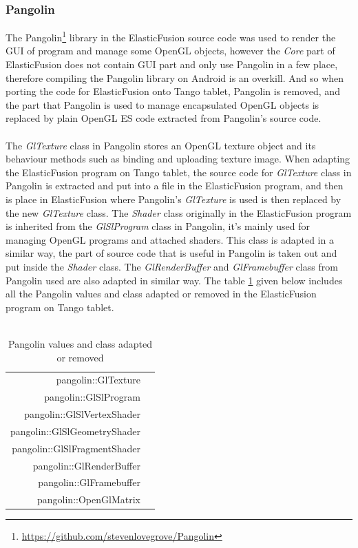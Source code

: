 \documentclass[12pt,twoside]{article}
\begin{document}
\subsubsection{Pangolin}
The Pangolin\footnote{\url{https://github.com/stevenlovegrove/Pangolin}} library in the ElasticFusion source code was used to render the GUI of program and manage some OpenGL objects, however the \textit{Core} part of ElasticFusion does not contain GUI part and only use Pangolin in a few place, therefore compiling the Pangolin library on Android is an overkill. And so when porting the code for ElasticFusion onto Tango tablet, Pangolin is removed, and the part that Pangolin is used to manage encapsulated OpenGL objects is replaced by plain OpenGL ES code extracted from Pangolin's source code.\\
\\
The \textit{GlTexture} class in Pangolin stores an OpenGL texture object and its behaviour methods such as binding and uploading texture image. When adapting the ElasticFusion program on Tango tablet, the source code for \textit{GlTexture} class in Pangolin is extracted and put into a file in the ElasticFusion program, and then is place in ElasticFusion where Pangolin's \textit{GlTexture} is used is then replaced by the new \textit{GlTexture} class. The \textit{Shader} class originally in the ElasticFusion program is inherited from the \textit{GlSlProgram} class in Pangolin, it's mainly used for managing OpenGL programs and attached shaders. This class is adapted in a similar way, the part of source code that is useful in Pangolin is taken out and put inside the \textit{Shader} class. The \textit{GlRenderBuffer} and \textit{GlFramebuffer} class from Pangolin used are also adapted in similar way. The table \ref{table:Pangolin table} given below includes all the Pangolin values and class adapted or removed in the ElasticFusion program on Tango tablet.\\
\\
\begin{table}
\centering
\caption{Pangolin values and class adapted or removed}
\label{table:Pangolin table}
\begin{tabular}{|r|l|}
  \hline
  pangolin::GlTexture  \\
  pangolin::GlSlProgram  \\
  pangolin::GlSlVertexShader  \\
  pangolin::GlSlGeometryShader \\
  pangolin::GlSlFragmentShader  \\
  pangolin::GlRenderBuffer  \\
  pangolin::GlFramebuffer \\
   pangolin::OpenGlMatrix \\
    \hline
\end{tabular}
\end{table}
\end{document}
